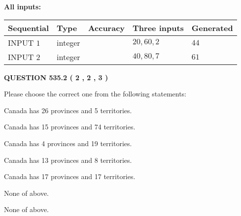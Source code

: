 \documentclass[12pt]{article}
\begin{document}
   
   
   
\noindent{}
   
   
   
   
\noindent\vspace{0.1in}\hspace{-0.08in} {\textbf{\Large{All inputs: }}}
   
   
  
  
\noindent\begin{tabular}{|l|l|l|l|l|}
\hline
 Sequential & Type & Accuracy & Three inputs & Generated \\ 
\hline
 
 
  INPUT $  1 $ & integer &  & $
 20
 , 
 60
 , 
 2
 $ & $ 44 $ 
 \\  \hline  
 
 
  INPUT $  2 $ & integer &  & $
 40
 , 
 80
 , 
 7
 $ & $ 61 $ 
 \\  \hline  
 \end{tabular}
   
   
  
\vspace{0.2in}
  
{\textbf{\Large{QUESTION
535.2 
 ( 2 , 2 , 3 )
}}}
  
  
Please choose the correct one from the following statements:
 
 
Canada has  26 provinces and  5 territories.
 
 
Canada has  15 provinces and  74 territories.
 
 
Canada has   4 provinces and  19 territories.
 
 
Canada has  13 provinces and  8 territories.
 
 
Canada has  17 provinces and  17 territories.
 
 
 None of above.
 
 
\noindent{}
 
 
 None of above.
 
 
\noindent{}
 
 
   
   
   
\end{document}
